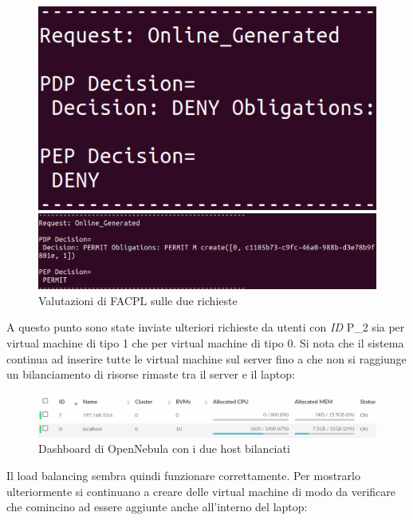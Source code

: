 \begin{figure}[H]
    \begin{minipage}{0.27\textwidth}
        \centering
        \includegraphics[width=\textwidth]{tesi_screenshot/DenyP1_1_cut.png}
    \end{minipage}
    \begin{minipage}{0.72\textwidth}
        \centering
        \includegraphics[width=\textwidth]{tesi_screenshot/Permit_P2_1.png}
    \end{minipage}
    \caption{Valutazioni di FACPL sulle due richieste}
\end{figure}
A questo punto sono state inviate ulteriori richieste da utenti con \emph{ID} P\_2 sia per virtual machine di tipo 1 che per virtual machine di tipo 0. Si nota che il sistema continua ad inserire tutte le virtual machine sul server fino a che non si raggiunge un bilanciamento di risorse rimaste tra il server e il laptop:
\begin{figure}[H]
    \centering
    \includegraphics[width=\textwidth]{tesi_screenshot/OpenNebula_eavenLoad.png}
    \caption{Dashboard di OpenNebula con i due host bilanciati}
\end{figure}
Il load balancing sembra quindi funzionare correttamente. Per mostrarlo ulteriormente si continuano a creare delle virtual machine di modo da verificare che comincino ad essere aggiunte anche all'interno del laptop:
